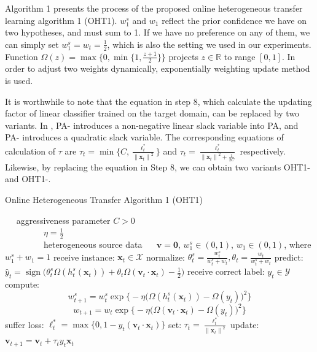 \documentclass[letterpaper]{article}
\theoremstyle{remark}
\theoremstyle{definition}
\DeclareMathOperator{\sign}{sign}
\begin{document}
Algorithm 1 presents the process of the proposed online heterogeneous transfer learning algorithm 1 (OHT1).
$w_{1}^{s}$ and $w_1$ reflect the prior confidence we have on two hypotheses, and must sum to 1.
If we have no preference on any of them, we can simply set $w_{1}^{s} = w_{t} = \frac{1}{2}$, which is also the setting we used in our experiments.
Function $\varOmega(z) = \max \{ 0, \min \{ 1, \frac{z+1}{2} \}\}$ projects $z \in \mathbb{R}$ to range $[0,1]$.
In order to adjust two weights dynamically, exponentially weighting update method \cite{cesa2006prediction} is used.

It is worthwhile to note that the equation in step 8, which calculate the updating factor of linear classifier trained on the target domain, can be replaced by two variants.
In \cite{crammer2006online}, PA-\uppercase\expandafter{} introduces a non-negative linear slack variable into PA, and PA-\uppercase\expandafter{} introduces a quadratic slack variable.
The corresponding equations of calculation of $\tau$ are $\tau_t = \min \{ C, \frac{\ell_{t}^{*}}{{\|\mathbf{x}_t\|}^2} \} $ and $ \tau_t = \frac{\ell_{t}^{*}}{{\|\mathbf{x}_t\|}^2 + \frac{1}{2C}} $ respectively.
Likewise, by replacing the equation in Step 8, we can obtain two variants OHT1-\uppercase\expandafter{} and OHT1-\uppercase\expandafter{}.

\begin{algorithm}
\begin{algorithmic}[1]
\caption{Online Heterogeneous Transfer Algorithm 1 (OHT1)}
\REQUIRE ~~
aggressiveness parameter $C>0$\\ 
~~~~~~~~~$\eta = \frac{1}{2}$ \\
~~~~~~~~~heterogeneous source data
\ENSURE ~~
$\mathbf{v} = \mathbf{0}$, $w_{1}^{s} \in (0,1)$, $w_{1} \in (0,1)$, where $w_{1}^{s} + w_1 = 1$
\STATE 
  receive instance: $\mathbf{x}_t \in \mathcal{X}$
\STATE
  normalize: $\theta_{t}^{s} = \frac{w_{t}^{s}}{w_{t}^{s}+w_t}, \theta_{t} = \frac{w_{t}}{w_{t}^{s}+w_t}$
\STATE
  predict: $\hat{y}_t = \sign \big( \theta_{t}^{s} \varOmega (h_{t}^{s}(\mathbf{x}_t)) + \theta_{t} \varOmega (\mathbf{v}_t \cdot \mathbf{x}_t) - \frac{1}{2} \big)$
\STATE
  receive correct label: $y_t \in \mathcal{Y}$
\STATE
  compute: 
    $$w_{t+1}^{s} = w_{t}^{s} \exp \big\{ -\eta \big(\varOmega(h_{t}^{s}(\mathbf{x}_t)) - \varOmega(y_t)\big)^2 \big\} $$
    $$w_{t+1} = w_{t} \exp \big\{ -\eta \big(\varOmega(\mathbf{v}_t \cdot \mathbf{x}_t) - \varOmega(y_t)\big)^2 \big\} $$
\STATE
  suffer loss: $\ell_{t}^{*} = \max \{0, 1-y_t(\mathbf{v}_t \cdot \mathbf{x}_t)\}$
\STATE
  set: $\tau_t = \frac{\ell_{t}^{*}}{{\|\mathbf{x}_t\|}^2}$
\STATE
  update: $ \mathbf{v}_{t+1} = \mathbf{v}_t + \tau_t y_t \mathbf{x}_t $
\ENDFOR
\end{algorithmic}
\end{algorithm}
\end{document}
